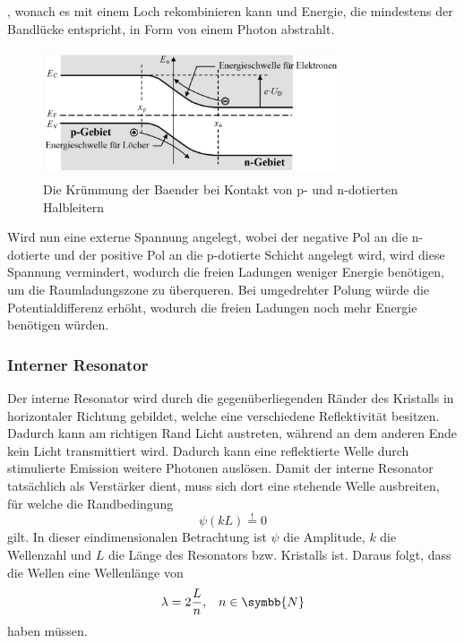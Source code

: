 , wonach es mit einem Loch rekombinieren kann und Energie, die mindestens der Bandlücke entspricht, in Form von einem Photon abstrahlt.
\begin{figure}
    \centering
    \includegraphics[width = 0.78\textwidth]{pictures/kruemmung.png}
    \caption{Die Krümmung der Baender bei Kontakt von p- und n-dotierten Halbleitern\cite{kruemmung}}
    \label{pic:kruemmung}
\end{figure}
Wird nun eine externe Spannung angelegt, wobei der negative Pol an die n-dotierte und der positive Pol an die p-dotierte Schicht angelegt wird, wird diese Spannung vermindert,
wodurch die freien Ladungen weniger Energie benötigen, um die Raumladungszone zu überqueren.
Bei umgedrehter Polung würde die Potentialdifferenz erhöht, wodurch die freien Ladungen noch mehr Energie benötigen würden.
\subsubsection{Interner Resonator}
\label{subsubsec:internerResonator}
Der interne Resonator wird durch die gegenüberliegenden Ränder des Kristalls in horizontaler Richtung gebildet, welche eine verschiedene Reflektivität besitzen.
Dadurch kann am richtigen Rand Licht austreten, während an dem anderen Ende kein Licht transmittiert wird.
Dadurch kann eine reflektierte Welle durch stimulierte Emission weitere Photonen auslösen.
Damit der interne Resonator tatsächlich als Verstärker dient,
muss sich dort eine stehende Welle ausbreiten, für welche die Randbedingung 
\begin{equation}
    \psi \left (kL \right ) \overset{!}{=} 0    \label{eqn:psi}
\end{equation}
gilt. In dieser eindimensionalen Betrachtung ist $\psi$ die Amplitude, $k$ die Wellenzahl und $L$ die Länge des Resonators bzw. Kristalls ist. 
Daraus folgt, dass die Wellen eine Wellenlänge von 
\begin{equation}
    \lambda = 2\frac{L}{n}, \; \; \; n \in \symbb{N} \label{eqn:lambda}
\end{equation}
haben müssen.
